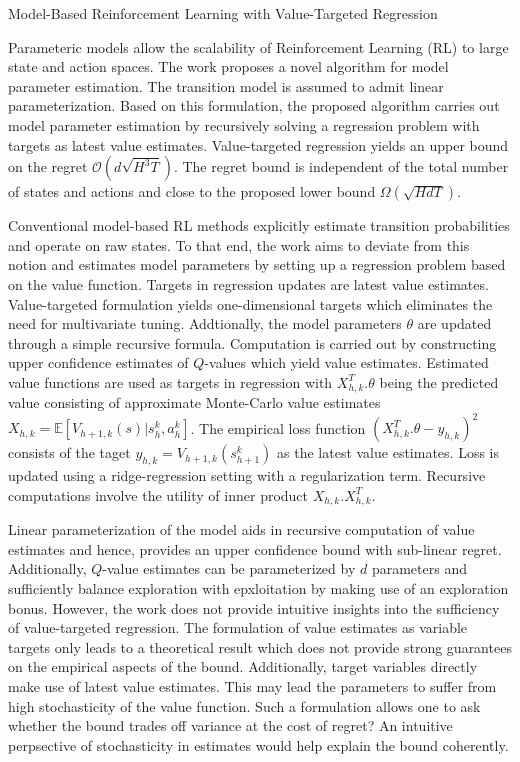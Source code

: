 \documentclass[12pt,letterpaper]{article}
\begin{document}
\begin{center}
  \large{Model-Based Reinforcement Learning with Value-Targeted Regression}
\end{center}

Parameteric models allow the scalability of Reinforcement Learning (RL) to large state and action spaces. The work proposes a novel algorithm for model parameter estimation. The transition model is assumed to admit linear parameterization. Based on this formulation, the proposed algorithm carries out model parameter estimation by recursively solving a regression problem with targets as latest value estimates. Value-targeted regression yields an upper bound on the regret $\mathcal{O}(d\sqrt{H^{3}T})$. The regret bound is independent of the total number of states and actions and close to the proposed lower bound $\Omega(\sqrt{HdT})$.

Conventional model-based RL methods explicitly estimate transition probabilities and operate on raw states. To that end, the work aims to deviate from this notion and estimates model parameters by setting up a regression problem based on the value function. Targets in regression updates are latest value estimates. Value-targeted formulation yields one-dimensional targets which eliminates the need for multivariate tuning. Addtionally, the model parameters $\theta$ are updated through a simple recursive formula. Computation is carried out by constructing upper confidence estimates of $Q$-values which yield value estimates. Estimated value functions are used as targets in regression with $X_{h,k}^T.\theta$ being the predicted value consisting of approximate Monte-Carlo value estimates $X_{h,k} = \mathbb{E}[V_{h+1,k}(s)|s_{h}^{k},a_{h}^{k}]$. The empirical loss function $(X_{h,k}^{T}.\theta - y_{h,k})^{2}$ consists of the taget $y_{h,k} = V_{h+1,k}(s_{h+1}^{k})$ as the latest value estimates. Loss is updated using a ridge-regression setting with a regularization term. Recursive computations involve the utility of inner product $X_{h,k}.X_{h,k}^{T}$. 

Linear parameterization of the model aids in recursive computation of value estimates and hence, provides an upper confidence bound with sub-linear regret. Additionally, $Q$-value estimates can be parameterized by $d$ parameters and sufficiently balance exploration with epxloitation by making use of an exploration bonus. However, the work does not provide intuitive insights into the sufficiency of value-targeted regression. The formulation of value estimates as variable targets only leads to a theoretical result which does not provide strong guarantees on the empirical aspects of the bound. Additionally, target variables directly make use of latest value estimates. This may lead the parameters to suffer from high stochasticity of the value function. Such a formulation allows one to ask whether the bound trades off variance at the cost of regret? An intuitive perpsective of stochasticity in estimates would help explain the bound coherently.
\end{document}

